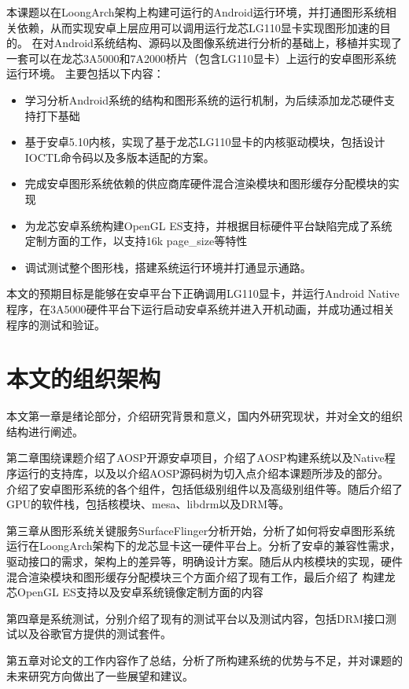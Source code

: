 本课题以在LoongArch架构上构建可运行的Android运行环境，并打通图形系统相关依赖，从而实现安卓上层应用可以调用运行龙芯LG110显卡实现图形加速的目的。
在对Android系统结构、源码以及图像系统进行分析的基础上，移植并实现了一套可以在龙芯3A5000和7A2000桥片（包含LG110显卡）上运行的安卓图形系统运行环境。
主要包括以下内容：
\begin{itemize}
  \item 学习分析Android系统的结构和图形系统的运行机制，为后续添加龙芯硬件支持打下基础
  \item 基于安卓5.10内核，实现了基于龙芯LG110显卡的内核驱动模块，包括设计IOCTL命令码以及多版本适配的方案。
  \item 完成安卓图形系统依赖的供应商库硬件混合渲染模块和图形缓存分配模块的实现
  \item 为龙芯安卓系统构建OpenGL ES支持，并根据目标硬件平台缺陷完成了系统定制方面的工作，以支持16k page\_size等特性
  \item 调试测试整个图形栈，搭建系统运行环境并打通显示通路。
\end{itemize}
本文的预期目标是能够在安卓平台下正确调用LG110显卡，并运行Android Native程序，在3A5000硬件平台下运行启动安卓系统并进入开机动画，并成功通过相关
程序的测试和验证。

\section{本文的组织架构}
本文第一章是绪论部分，介绍研究背景和意义，国内外研究现状，并对全文的组织结构进行阐述。

第二章围绕课题介绍了AOSP开源安卓项目，介绍了AOSP构建系统以及Native程序运行的支持库，以及以介绍AOSP源码树为切入点介绍本课题所涉及的部分。
介绍了安卓图形系统的各个组件，包括低级别组件以及高级别组件等。随后介绍了GPU的软件栈，包括核模块、mesa、libdrm以及DRM等。

第三章从图形系统关键服务SurfaceFlinger分析开始，分析了如何将安卓图形系统运行在LoongArch架构下的龙芯显卡这一硬件平台上。分析了安卓的兼容性需求，
驱动接口的需求，架构上的差异等，明确设计方案。随后从内核模块的实现，硬件混合渲染模块和图形缓存分配模块三个方面介绍了现有工作，最后介绍了
构建龙芯OpenGL ES支持以及安卓系统镜像定制方面的内容

第四章是系统测试，分别介绍了现有的测试平台以及测试内容，包括DRM接口测试以及谷歌官方提供的测试套件。

第五章对论文的工作内容作了总结，分析了所构建系统的优势与不足，并对课题的未来研究方向做出了一些展望和建议。

